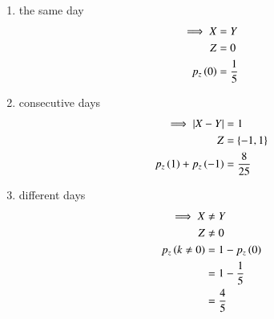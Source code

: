\documentclass[journal,12pt,onecolumn]{IEEEtran}
\theoremstyle{remark}
\begin{document}
\begin{enumerate}[label=(\roman*)]
	\item the same day
	\begin{align}
	\implies X &= Y\\
	Z &= 0\\
	p_z\left(0\right) &= \frac{1}{5}
	\end{align}
	\item consecutive days
	\begin{align}
	\implies \left\vert X - Y\right\vert &= 1\\
	Z &= \left\{-1,1\right\}\\
	p_z\left(1\right) + p_z\left(-1\right) &= \frac{8}{25}
	\end{align}
	\item different days
	\begin{align}
	\implies X &\neq Y\\
	Z &\neq 0 \\
	p_z\left(k \neq 0\right) &= 1 - p_z\left(0\right)\\
	&= 1 - \frac{1}{5}\\
	&= \frac{4}{5}
	\end{align} 
\end{enumerate}
%		




\end{document}

